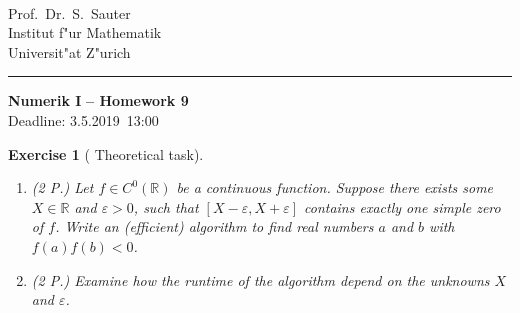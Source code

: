 \documentclass[11pt,a4paper,german]{scrartcl}
\def\blnr{9}              %
\def\sdate{3.5.2019}    %
\newcounter{aufgnr}
\theoremstyle{break}   %
\newtheorem{aufg}[aufgnr]{Exercise}
\begin{document}
\parbox{0ex}{    }   \\

\parbox{25ex}{
  Prof.~Dr.~S.~Sauter\\
  Institut f"ur Mathematik\\
  Universit"at Z"urich
  }
%
\rule[0cm]{0.cm}{.01cm}
\hfill  \parbox{0.6\textwidth}{
  {\sffamily\LARGE\bfseries Numerik I}
  {\sffamily\Large\bfseries \;\;--\;\; Homework \blnr }\\[1.5ex]
  Deadline: \sdate\ 13:00
  }
  
  
\vspace{10ex}

% 
% 
\begin{aufg}[ Theoretical task]
\begin{enumerate}
\item (2 P.) Let $f \in C^0(\mathbb{R})$ be a continuous function. Suppose there exists some $X \in \mathbb{R}$ and $\varepsilon>0$, such that $[X-\varepsilon, X+\varepsilon]$ contains exactly one simple zero of $f$. Write an (efficient) algorithm to find real numbers $a$ and $b$ with $f(a)f(b)<0$.
\item (2 P.) Examine how the runtime of the algorithm depend on the unknowns $X$ and $\varepsilon$.
\end{enumerate}
\end{aufg}
\end{document}
